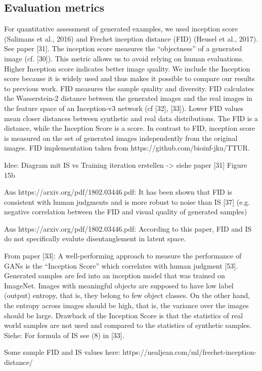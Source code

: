 \documentclass[12pt,a4paper]{article}
\begin{document}
\subsection{Evaluation metrics}
For quantitative assessment of generated examples, we used inception score (Salimans et al., 2016)
and Frechet inception distance (FID) (Heusel et al., 2017). See paper [31]. The inception score measures the “objectness” of a generated image (cf. [30]). This metric allows us to avoid relying on human evaluations. Higher Inception score indicates better image quality. We include the Inception score because it is widely used and thus makes it
possible to compare our results to previous work. FID measures the sample quality and diversity. FID calculates the Wasserstein-2 distance between the generated images and the real images in the feature space of an Inception-v3 network (cf [32], [33]). Lower FID values mean closer distances between synthetic and real data distributions. The FID is a distance, while the Inception Score is a score. In contrast to FID, inception score is
measured on the set of generated images independently from the original images.
FID implementation taken from https://github.com/bioinf-jku/TTUR.

Idee: Diagram mit IS vs Training iteration erstellen -> siehe paper [31] Figure 15b

Aus https://arxiv.org/pdf/1802.03446.pdf: It has been shown that FID is consistent with human judgments and is more robust to noise than IS [37] (e.g. negative correlation between the FID and visual quality of generated samples)

Aus https://arxiv.org/pdf/1802.03446.pdf: According to this paper, FID and IS do not specifically evalute disentanglement in latent space.

From paper [33]: A well-performing approach to measure the performance of GANs is the
“Inception Score” which correlates with human judgment [53]. Generated samples are fed into an
inception model that was trained on ImageNet. Images with meaningful objects are supposed to
have low label (output) entropy, that is, they belong to few object classes. On the other hand, the
entropy across images should be high, that is, the variance over the images should be large. Drawback
of the Inception Score is that the statistics of real world samples are not used and compared to the
statistics of synthetic samples.
Siehe: For formula of IS see (8) in [33].
    
Some sample FID and IS values here: https://nealjean.com/ml/frechet-inception-distance/    
    
\end{document}
